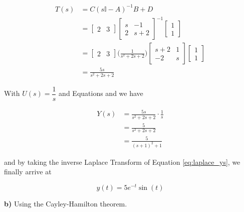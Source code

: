 \begin{align}
  T(s) &= C (s\mathbb{I} - A)^{-1} B + D \nonumber \\
       &=
       \begin{bmatrix}
        2 & 3
       \end{bmatrix}
       \begin{bmatrix}
        s & -1 \\
        2 & s + 2
      \end{bmatrix}^{-1}
      \begin{bmatrix}
       1 \\ 1
      \end{bmatrix} \nonumber \\
      &=
      \begin{bmatrix}
       2 & 3
      \end{bmatrix}
      \Bigg(\frac{1}{s^2 + 2s + 2} \Bigg)
      \begin{bmatrix}
       s + 2 & 1 \\
       -2     & s
      \end{bmatrix}
      \begin{bmatrix}
       1 \\ 1
      \end{bmatrix} \nonumber \\
      &= \frac{5s}{s^2 + 2s + 2} \label{eq:laplace_tf}
\end{align}

With $U(s) = \dfrac{1}{s}$ and Equations \label{eq:laplace_output_tf} and
\label{eq:laplace_tf} we have

\begin{align}
  Y(s) &= \frac{5s}{s^2 + 2s + 2} \cdot \frac{1}{s} \nonumber \\
       &= \frac{5}{s^2 + 2s + 2} \nonumber \\
       &= \frac{5}{(s + 1)^2 + 1} \label{eq:laplace_ys}
\end{align}

\noindent and by taking the inverse Laplace Transform of Equation
\ref{eq:laplace_ys}, we finally arrive at

\begin{equation}
  y(t) = 5e^{-t} \sin (t)
\end{equation}

\noindent \textbf{b)} Using the Cayley-Hamilton theorem.
